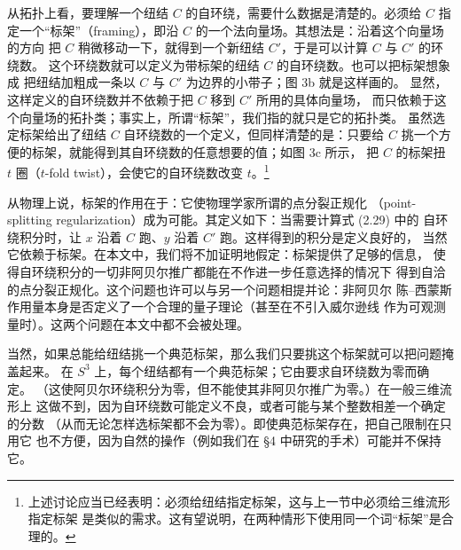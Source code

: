 \documentclass[11pt,a4paper]{article}
\begin{document}
从拓扑上看，要理解一个纽结 $C$ 的自环绕，需要什么数据是清楚的。必须给 $C$
指定一个“标架”（framing），即沿 $C$ 的一个法向量场。其想法是：沿着这个向量场的方向
把 $C$ 稍微移动一下，就得到一个新纽结 $C'$，于是可以计算 $C$ 与 $C'$ 的环绕数。
这个环绕数就可以定义为带标架的纽结 $C$ 的自环绕数。也可以把标架想象成
把纽结加粗成一条以 $C$ 与 $C'$ 为边界的小带子；图 3b 就是这样画的。
显然，这样定义的自环绕数并不依赖于把 $C$ 移到 $C'$ 所用的具体向量场，
而只依赖于这个向量场的拓扑类；事实上，所谓“标架”，我们指的就只是它的拓扑类。
虽然选定标架给出了纽结 $C$ 自环绕数的一个定义，但同样清楚的是：只要给 $C$
挑一个方便的标架，就能得到其自环绕数的任意想要的值；如图 3c 所示，
把 $C$ 的标架扭 $t$ 圈（$t$-fold twist），会使它的自环绕数改变 $t$。\footnote{%
上述讨论应当已经表明：必须给纽结指定标架，这与上一节中必须给三维流形指定标架
是类似的需求。这有望说明，在两种情形下使用同一个词“标架”是合理的。}

从物理上说，标架的作用在于：它使物理学家所谓的点分裂正规化
（point-splitting regularization）成为可能。其定义如下：当需要计算式 (2.29) 中的
自环绕积分时，让 $x$ 沿着 $C$ 跑、$y$ 沿着 $C'$ 跑。这样得到的积分是定义良好的，
当然它依赖于标架。在本文中，我们将不加证明地假定：标架提供了足够的信息，
使得自环绕积分的一切非阿贝尔推广都能在不作进一步任意选择的情况下
得到自洽的点分裂正规化。这个问题也许可以与另一个问题相提并论：非阿贝尔
陈–西蒙斯作用量本身是否定义了一个合理的量子理论（甚至在不引入威尔逊线
作为可观测量时）。这两个问题在本文中都不会被处理。


当然，如果总能给纽结挑一个典范标架，那么我们只要挑这个标架就可以把问题掩盖起来。
在 $S^3$ 上，每个纽结都有一个典范标架；它由要求自环绕数为零而确定。
（这使阿贝尔环绕积分为零，但不能使其非阿贝尔推广为零。）在一般三维流形上
这做不到，因为自环绕数可能定义不良，或者可能与某个整数相差一个确定的分数
（从而无论怎样选标架都不会为零）。即使典范标架存在，把自己限制在只用它
也不方便，因为自然的操作（例如我们在 §4 中研究的手术）可能并不保持它。
\end{document}
